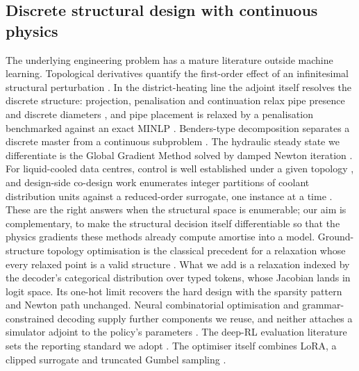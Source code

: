 \subsection{Discrete structural design with continuous physics}
\label{sec:rw-structural}
The underlying engineering problem has a mature literature outside machine
learning.  Topological derivatives quantify the first-order effect of an
infinitesimal structural perturbation \cite{sokolowski1999topological}.
In the district-heating line the adjoint itself resolves the discrete structure:
projection, penalisation and continuation relax pipe presence and discrete
diameters \cite{blommaert2020adjoint}, and pipe placement is relaxed by a
penalisation benchmarked against an exact MINLP \cite{wack2022energy,wack2023gap}.  Benders-type decomposition separates a discrete
master from a continuous subproblem
\cite{geoffrion1972benders}.  The hydraulic steady state we
differentiate is the Global Gradient Method solved by damped Newton iteration
\cite{todini1988gga,knoll2004jfnk}.  For liquid-cooled data centres, control is
well established under a given topology \cite{lcopt2025}, and design-side
co-design work enumerates integer partitions of coolant distribution units
against a reduced-order surrogate, one instance at a time
\cite{jadhav2026codesign}.  These are the
right answers when the structural space is enumerable; our aim is
complementary, to make the structural decision itself differentiable so that the
physics gradients these methods already compute amortise into a model.
Ground-structure topology optimisation is the classical precedent for a
relaxation whose every relaxed point is a valid structure
\cite{dorn1964automatic,guest2004minimum}.  What we add is a relaxation indexed by
the decoder's categorical distribution over typed tokens, whose Jacobian lands in
logit space.  Its one-hot limit recovers the hard design with the sparsity pattern
and Newton path unchanged.  Neural combinatorial optimisation and grammar-constrained
decoding supply further components we reuse, and neither attaches a simulator
adjoint to the policy's parameters
\cite{vinyals2015pointer,willard2023guided}.
The deep-RL evaluation literature sets the reporting standard we adopt
\cite{agarwal2021precipice,henderson2018matters}.  The optimiser itself combines
LoRA, a clipped surrogate and truncated Gumbel sampling
\cite{hu2021lora,schulman2017ppo,kool2019stochastic}.

